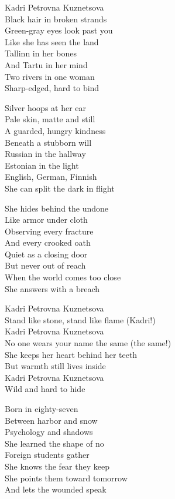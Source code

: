 \begin{lyrics}
Kadri Petrovna Kuznetsova\\
Black hair in broken strands\\
Green-gray eyes look past you\\
Like she has seen the land\\
Tallinn in her bones\\
And Tartu in her mind\\
Two rivers in one woman\\
Sharp-edged, hard to bind

Silver hoops at her ear\\
Pale skin, matte and still\\
A guarded, hungry kindness\\
Beneath a stubborn will\\
Russian in the hallway\\
Estonian in the light\\
English, German, Finnish\\
She can split the dark in flight

She hides behind the undone\\
Like armor under cloth\\
Observing every fracture\\
And every crooked oath\\
Quiet as a closing door\\
But never out of reach\\
When the world comes too close\\
She answers with a breach

Kadri Petrovna Kuznetsova\\
Stand like stone, stand like flame (Kadri!)\\
Kadri Petrovna Kuznetsova\\
No one wears your name the same (the same!)\\
She keeps her heart behind her teeth\\
But warmth still lives inside\\
Kadri Petrovna Kuznetsova\\
Wild and hard to hide

Born in eighty-seven\\
Between harbor and snow\\
Psychology and shadows\\
She learned the shape of no\\
Foreign students gather\\
She knows the fear they keep\\
She points them toward tomorrow\\
And lets the wounded speak


\end{lyrics}
